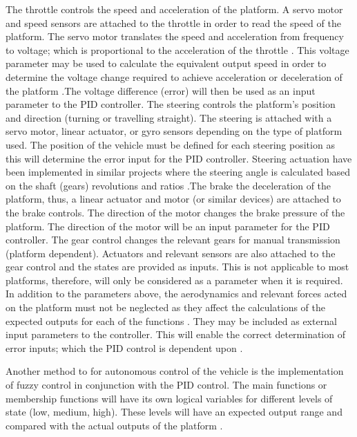 \documentclass[main.tex]{subfiles}
\begin{document}
The throttle controls the speed and acceleration of the platform. A servo motor and speed sensors are attached to the throttle in order to read the speed of the platform. The servo motor translates the speed and acceleration from frequency to voltage; which is proportional to the acceleration of the throttle \parencite{scheiner2011}. This voltage parameter may be used to calculate the equivalent output speed in order to determine the voltage change required to achieve acceleration or deceleration of the platform \parencite{scheiner2011}.The voltage difference (error) will then be used as an input parameter to the PID controller. The steering controls the platform’s position and direction (turning or travelling straight). The steering is attached with a servo motor, linear actuator, or gyro sensors depending on the type of platform used. The position of the vehicle must be defined for each steering position as this will determine the error input for the PID controller. Steering actuation have been implemented in similar projects where the steering angle is calculated based on the shaft (gears) revolutions and ratios \parencite{zhang2010study,zhao2012design}.The brake the deceleration of the platform, thus, a linear actuator and motor (or similar devices) are attached to the brake controls. The direction of the motor changes the brake pressure of the platform. The direction of the motor will be an input parameter for the PID controller. The gear control changes the relevant gears for manual transmission (platform dependent). Actuators and relevant sensors are also attached to the gear control and the states are provided as inputs. This is not applicable to most platforms, therefore, will only be considered as a parameter when it is required. In addition to the parameters above, the aerodynamics and relevant forces acted on the platform must not be neglected as they affect the calculations of the expected outputs for each of the functions  \parencite{zhao2012design}. They may be included as external input parameters to the controller. This will enable the correct determination of error inputs; which the PID control is dependent upon \parencite{zhao2012design}. 

Another method to for autonomous control of the vehicle is the implementation of fuzzy control in conjunction with the PID control. The main functions or membership functions will have its own logical variables for different levels of state (low, medium, high). These levels will have an expected output range and compared with the actual outputs of the platform \parencite{johnson2005pid}.  
\end{document}
